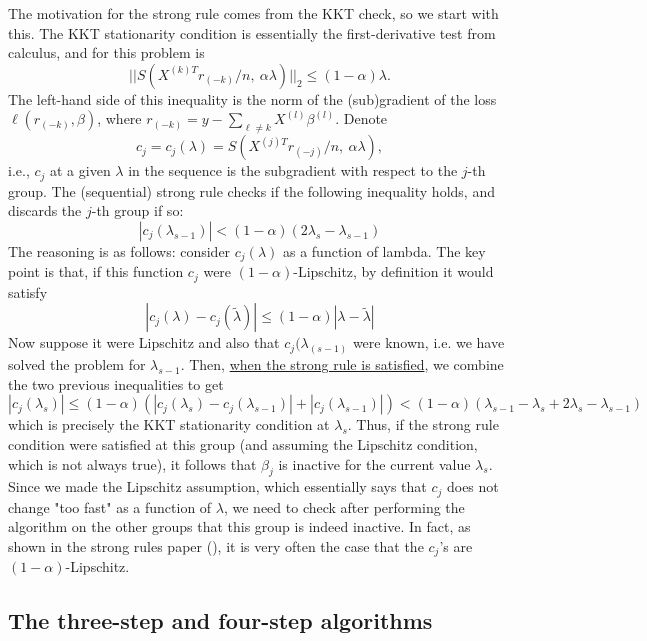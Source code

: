 \documentclass[12pt]{article}
\begin{document}
The motivation for the strong rule comes from the KKT check, so we start with this. The KKT stationarity condition \citep{boyd2004convex} is essentially the first-derivative test from calculus, and for this problem is 
\[
||S(X^{(k)T}r_{(-k)}/n,\ \alpha\lambda)||_2 \leq (1-\alpha)\lambda.
\]
The left-hand side of this inequality is the norm of the (sub)gradient of the loss $\ell(r_{(-k)},\beta)$, where $r_{(-k)}= y - \sum_{\ell \neq k} X^{(l)}\beta^{(l)}$.
Denote 
\[
c_j = c_j(\lambda) = S(X^{(j)T}r_{(-j)}/n,\ \alpha\lambda),
\]
i.e., $c_j$ at a given $\lambda$ in the sequence is the subgradient with respect to the $j$-th group.
The (sequential) strong rule checks if the following inequality holds, and discards the $j$-th group if so:
\begin{equation}
|c_j(\lambda_{s-1})| < (1-\alpha)(2\lambda_s - \lambda_{s-1})
\label{eq:strongcond}
\end{equation}
The reasoning is as follows: consider $c_j(\lambda)$ as a function of lambda. The key point is that, if this function $c_j$ were $(1-\alpha)$-Lipschitz, by definition it would satisfy
\[
|c_j(\lambda) - c_j(\tilde{\lambda})|\leq (1-\alpha)|\lambda-\tilde{\lambda}|
\]
Now suppose it were Lipschitz and also that $c_j(\lambda_{(s-1)}$ were known, i.e. we have solved the problem for $\lambda_{s-1}$. Then, \underline{when the strong rule is satisfied}, we combine the two previous inequalities to get
\[
|c_j(\lambda_s)|\leq (1-\alpha)(|c_j(\lambda_s) - c_j(\lambda_{s-1})|+|c_j(\lambda_{s-1})|)<(1-\alpha)(\lambda_{s-1}-\lambda_s+2\lambda_{s}-\lambda_{s-1})
\]
which is precisely the KKT stationarity condition at $\lambda_s$. Thus, if the strong rule condition were satisfied at this group (and assuming the Lipschitz condition, which is not always true), it follows that $\beta_j$ is inactive for the current value $\lambda_s$. Since we made the Lipschitz assumption, which essentially says that $c_j$ does not change "too fast" as a function of $\lambda$, we need to check after performing the algorithm on the other groups that this group is indeed inactive. In fact, as shown in the strong rules paper (), it is very often the case that the $c_j$'s are $(1-\alpha)$-Lipschitz.

\subsection{The three-step and four-step algorithms}
\end{document}
